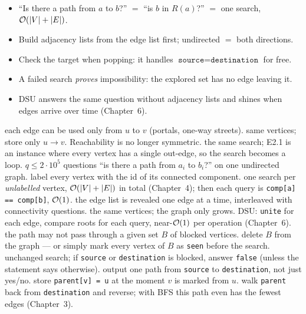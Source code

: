 \begin{itemize}[leftmargin=*]
    \item ``Is there a path from $a$ to $b$?'' $=$ ``is $b$ in $R(a)$?'' $=$ one search, $\mathcal{O}(|V|+|E|)$.
    \item Build adjacency lists from the edge list first; undirected $=$ both directions.
    \item Check the target when popping: it handles $\texttt{source} = \texttt{destination}$ for free.
    \item A failed search \emph{proves} impossibility: the explored set has no edge leaving it.
    \item DSU answers the same question without adjacency lists and shines when edges arrive over time (Chapter~6).
\end{itemize}

\begin{variantsbox}
  {each edge can be used only from $u$ to $v$ (portals, one-way streets).}
  {same vertices; store only $u \to v$. Reachability is no longer symmetric.}
  {the same search; E2.1 is an instance where every vertex has a single out-edge, so the search becomes a loop.}
  {$q \le 2\cdot10^5$ questions ``is there a path from $a_i$ to $b_i$?'' on one undirected graph.}
  {label every vertex with the id of its connected component.}
  {one search per \emph{unlabelled} vertex, $\mathcal{O}(|V|+|E|)$ in total (Chapter~4); then each query is \texttt{comp[a] == comp[b]}, $\mathcal{O}(1)$.}
  {the edge list is revealed one edge at a time, interleaved with connectivity questions.}
  {the same vertices; the graph only grows.}
  {DSU: \texttt{unite} for each edge, compare roots for each query, near-$\mathcal{O}(1)$ per operation (Chapter~6).}
  {the path may not pass through a given set $B$ of blocked vertices.}
  {delete $B$ from the graph --- or simply mark every vertex of $B$ as \texttt{seen} before the search.}
  {unchanged search; if \texttt{source} or \texttt{destination} is blocked, answer \texttt{false} (unless the statement says otherwise).}
  {output one path from \texttt{source} to \texttt{destination}, not just yes/no.}
  {store \texttt{parent[v] = u} at the moment $v$ is marked from $u$.}
  {walk \texttt{parent} back from \texttt{destination} and reverse; with BFS this path even has the fewest edges (Chapter~3).}
\end{variantsbox}
